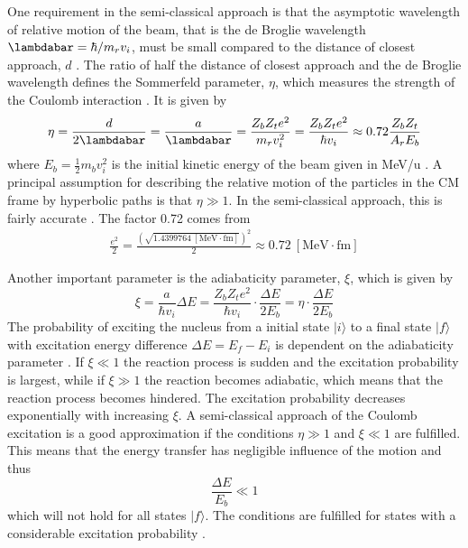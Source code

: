\documentclass[twoside,english]{uiofysmaster/uiofysmaster}
\begin{document}
One requirement in the semi-classical approach is that the asymptotic wavelength of relative motion of the beam, that is the de Broglie wavelength ${\lambdabar = \hbar/m_r v_i}$, must be small compared to the distance of closest approach, $d$ \cite{RBass, EE-Coulex}.
The ratio of half the distance of closest approach and the de Broglie wavelength defines the Sommerfeld parameter, $\eta$, which measures the strength of the Coulomb interaction \cite{Cline1969}.
It is given by
\begin{equation}
	\eta = \frac{d}{2\lambdabar} = \frac{a}{\lambdabar} = \frac{Z_b Z_t e^2}{m_r v_i^2} = \frac{Z_b Z_t e^2}{\hbar v_i} \approx 0.72 \frac{Z_b Z_t}{A_r E_b}
\end{equation}
where $E_b = \tfrac{1}{2} m_b v_i^2$ is the initial kinetic energy of the beam given in MeV/u \cite{RBass}.
A principal assumption for describing the relative motion of the particles in the CM frame by hyperbolic paths is that $\eta \gg 1$.
In the semi-classical approach, this is fairly accurate \cite{Cline1969}. 
The factor 0.72 comes from 
\begin{align}
	\frac{e^2}{2} = \frac{(\sqrt{1.4399764 ~[\text{MeV} \cdot \text{fm}]})^2}{2} \approx 0.72 ~[\text{MeV} \cdot \text{fm}]
\end{align}

Another important parameter is the adiabaticity parameter, $\xi$, which is given by 
\begin{equation}
	\xi = \frac{a}{\hbar v_i}  \Delta E = \frac{Z_b Z_t e^2}{\hbar v_i} \cdot \frac{\Delta E}{2E_b} = \eta \cdot \frac{\Delta E}{2E_b}
\end{equation}
The probability of exciting the nucleus from a initial state $|i\rangle$ to a final state $|f\rangle$ with excitation energy difference $\Delta E = E_f - E_i$ is dependent on the adiabaticity parameter \cite{Niedermaier, NaR, RBass}.
If $\xi \ll 1$ the reaction process is sudden and the excitation probability is largest, while if $\xi \gg 1$ the reaction becomes adiabatic, which means that the reaction process becomes hindered. 
The excitation probability decreases exponentially with increasing $\xi$. 
A semi-classical approach of the Coulomb excitation is a good approximation if the conditions $\eta \gg 1$ and $\xi \ll 1$ are fulfilled.
This means that the energy transfer has negligible influence of the motion and thus  
\begin{equation}
	\frac{\Delta E}{E_b} \ll 1
\end{equation}
which will not hold for all states $|f\rangle$.
The conditions are fulfilled for states with a considerable excitation probability \cite{EE-Coulex, RBass}.
\end{document}
